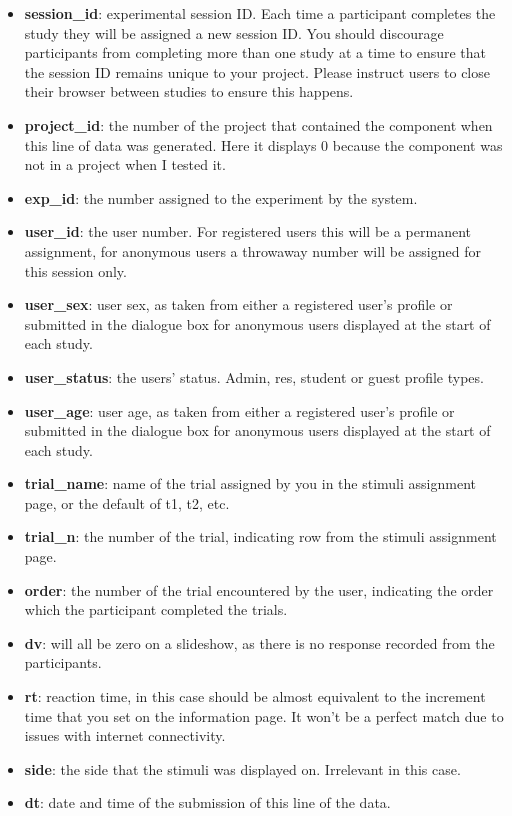 \documentclass[]{book}
\providecommand{\tightlist}{%
  \setlength{\itemsep}{0pt}\setlength{\parskip}{0pt}}
\begin{document}
\begin{itemize}
\tightlist
\item
  \textbf{session\_id}: experimental session ID. Each time a participant
  completes the study they will be assigned a new session ID. You should
  discourage participants from completing more than one study at a time
  to ensure that the session ID remains unique to your project. Please
  instruct users to close their browser between studies to ensure this
  happens.
\item
  \textbf{project\_id}: the number of the project that contained the
  component when this line of data was generated. Here it displays 0
  because the component was not in a project when I tested it.
\item
  \textbf{exp\_id}: the number assigned to the experiment by the system.
\item
  \textbf{user\_id}: the user number. For registered users this will be
  a permanent assignment, for anonymous users a throwaway number will be
  assigned for this session only.
\item
  \textbf{user\_sex}: user sex, as taken from either a registered user's
  profile or submitted in the dialogue box for anonymous users displayed
  at the start of each study.
\item
  \textbf{user\_status}: the users' status. Admin, res, student or guest
  profile types.
\item
  \textbf{user\_age}: user age, as taken from either a registered user's
  profile or submitted in the dialogue box for anonymous users displayed
  at the start of each study.
\item
  \textbf{trial\_name}: name of the trial assigned by you in the stimuli
  assignment page, or the default of t1, t2, etc.
\item
  \textbf{trial\_n}: the number of the trial, indicating row from the
  stimuli assignment page.
\item
  \textbf{order}: the number of the trial encountered by the user,
  indicating the order which the participant completed the trials.
\item
  \textbf{dv}: will all be zero on a slideshow, as there is no response
  recorded from the participants.
\item
  \textbf{rt}: reaction time, in this case should be almost equivalent
  to the increment time that you set on the information page. It won't
  be a perfect match due to issues with internet connectivity.
\item
  \textbf{side}: the side that the stimuli was displayed on. Irrelevant
  in this case.
\item
  \textbf{dt}: date and time of the submission of this line of the data.
\end{itemize}
\end{document}

